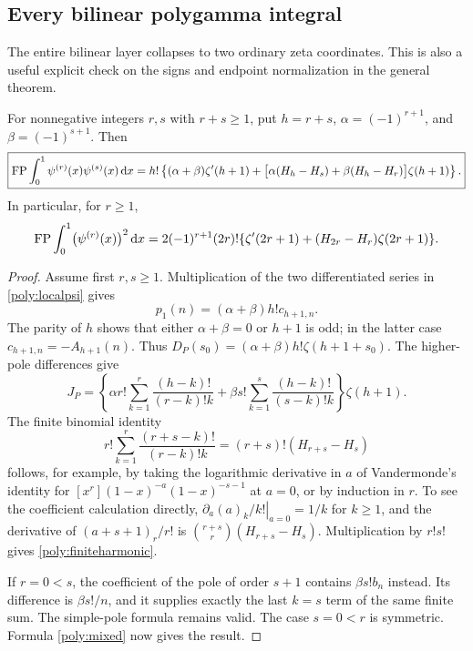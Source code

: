 \subsection{Every bilinear polygamma integral}

The entire bilinear layer collapses to two ordinary zeta coordinates.
This is also a useful explicit check on the signs and endpoint
normalization in the general theorem.

\begin{theorem}
\label{poly:bilinear}
For nonnegative integers $r,s$ with $r+s\ge1$, put $h=r+s$,
$\alpha=(-1)^{r+1}$, and $\beta=(-1)^{s+1}$. Then
\begin{align}\label{poly:bilineareq}
 \boxed{\displaystyle
 \operatorname{FP}\int_0^1\psi^{(r)}(x)\psi^{(s)}(x)\,\mathrm d x
 =h!\left\{(\alpha+\beta)\zeta'(h+1)
 +\bigl[\alpha(H_h-H_s)+\beta(H_h-H_r)\bigr]\zeta(h+1)\right\}.}
\end{align}
In particular, for $r\ge1$,
\begin{equation}\label{poly:square}
 \operatorname{FP}\int_0^1\bigl(\psi^{(r)}(x)\bigr)^2\,\mathrm d x
 =2(-1)^{r+1}(2r)!
 \{\zeta'(2r+1)+(H_{2r}-H_r)\zeta(2r+1)\}.
\end{equation}
\end{theorem}

\begin{proof}
Assume first $r,s\ge1$. Multiplication of the two differentiated
series in \eqref{poly:localpsi} gives
\[
 p_1(n)=(\alpha+\beta)h!c_{h+1,n}.
\]
The parity of $h$ shows that either $\alpha+\beta=0$ or
$h+1$ is odd; in the latter case $c_{h+1,n}=-A_{h+1}(n)$.
Thus
$D_P(s_0)=(\alpha+\beta)h!\zeta(h+1+s_0)$.
The higher-pole differences give
\[
 J_P=\left\{
 \alpha r!\sum_{k=1}^r\frac{(h-k)!}{(r-k)!k}
 +\beta s!\sum_{k=1}^s\frac{(h-k)!}{(s-k)!k}
 \right\}\zeta(h+1).
\]
The finite binomial identity
\begin{equation}\label{poly:finiteharmonic}
 r!\sum_{k=1}^r\frac{(r+s-k)!}{(r-k)!k}
 =(r+s)!(H_{r+s}-H_s)
\end{equation}
follows, for example, by taking the logarithmic derivative in $a$ of
Vandermonde's identity for $[x^r](1-x)^{-a}(1-x)^{-s-1}$ at
$a=0$, or by induction in $r$. To see the coefficient calculation
directly, $\left.\partial_a(a)_k/k!\right|_{a=0}=1/k$ for $k\ge1$,
and the derivative of $(a+s+1)_r/r!$ is
$\binom{r+s}{r}(H_{r+s}-H_s)$. Multiplication by $r!s!$
gives \eqref{poly:finiteharmonic}.

If $r=0<s$, the coefficient of the pole of order $s+1$ contains
$\beta s!b_n$ instead. Its difference is $\beta s!/n$, and it
supplies exactly the last $k=s$ term of the same finite sum.
The simple-pole formula remains valid. The case $s=0<r$ is symmetric.
Formula \eqref{poly:mixed} now gives the result.
\end{proof}

